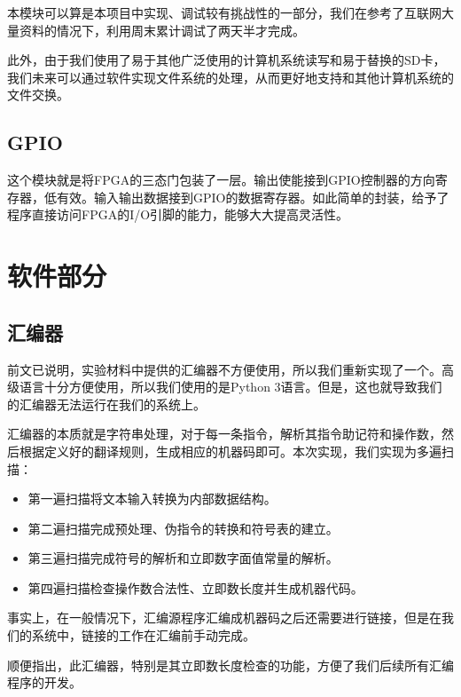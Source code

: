 \documentclass[11pt,utf8]{report}
\begin{document}
	\par 本模块可以算是本项目中实现、调试较有挑战性的一部分，我们在参考了互联网大量资料的情况下，利用周末累计调试了两天半才完成。
	\par 此外，由于我们使用了易于其他广泛使用的计算机系统读写和易于替换的SD卡，我们未来可以通过软件实现文件系统的处理，从而更好地支持和其他计算机系统的文件交换。

\subsection{GPIO}
	\par 这个模块就是将FPGA的三态门包装了一层。输出使能接到GPIO控制器的方向寄存器，低有效。输入输出数据接到GPIO的数据寄存器。如此简单的封装，给予了程序直接访问FPGA的I/O引脚的能力，能够大大提高灵活性。

\section{软件部分}

\subsection{汇编器}
	\par 前文已说明，实验材料中提供的汇编器不方便使用，所以我们重新实现了一个。高级语言十分方便使用，所以我们使用的是Python 3语言。但是，这也就导致我们的汇编器无法运行在我们的系统上。
	\par 汇编器的本质就是字符串处理，对于每一条指令，解析其指令助记符和操作数，然后根据定义好的翻译规则，生成相应的机器码即可。本次实现，我们实现为多遍扫描：
	\begin{itemize}
	\item 第一遍扫描将文本输入转换为内部数据结构。
	\item 第二遍扫描完成预处理、伪指令的转换和符号表的建立。
	\item 第三遍扫描完成符号的解析和立即数字面值常量的解析。
	\item 第四遍扫描检查操作数合法性、立即数长度并生成机器代码。
	\end{itemize}
	\par 事实上，在一般情况下，汇编源程序汇编成机器码之后还需要进行链接，但是在我们的系统中，链接的工作在汇编前手动完成。
	\par 顺便指出，此汇编器，特别是其立即数长度检查的功能，方便了我们后续所有汇编程序的开发。
	
\end{document}

